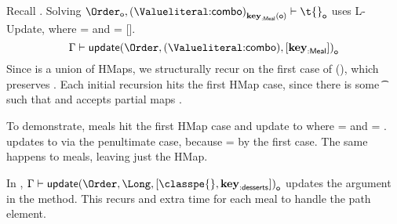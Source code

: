 Recall .
Solving
$
{ \inpropenv 
  {{\isprop{\Order}{\makelocal{o}}},
    {\isprop{\Value{\makekw{combo}}}{\path{\keype{\makekw{Meal}}}{\makelocal{o}}}}}
  {\isprop {\t{}} {\makelocal{o}}}}
$
uses L-Update, where \pathelem{} = {\emptypath{}} and \pathelemp{} = [{}].
$$
\inpropenv{\propenv{}}{\isprop{\update{\Order}{\Value{\makekw{combo}}}{[{\keype{\makekw{Meal}}}]}}{\makelocal{o}}}
$$
Since {\Order} is a union of HMaps, we structurally recur on the first case of \updateliteral{}
(),
which preserves \pathelem{}.
Each initial recursion hits the first HMap case, since there is some \t{} such that
{\inmandatory{\k{}}{\t{}}{\mandatory{}}} and 
\completenessmeta{} accepts partial maps \partial{}.

To demonstrate,
 meals hit the first HMap case and
update to { {\emptyabsent{}}}
where \sp{} = {}
and \mandatory{} = .
\sp{} updates to \Bot via the penultimate \updateliteral{} case,
because  = \Bot
by the first \restrictliteral{} case.
The same happens to  meals,
leaving just the  HMap. 

In ,
$
\inpropenv{\propenv{}}{\isprop{\update{\Order}{\Long}{[{\classpe{}}, {\keype{\makekw{desserts}}}]}}{\makelocal{o}}}
$
updates the argument in the {\Long} method.
This recurs and extra time for each meal to handle the {\classpe{}}
path element.
%
%
%
